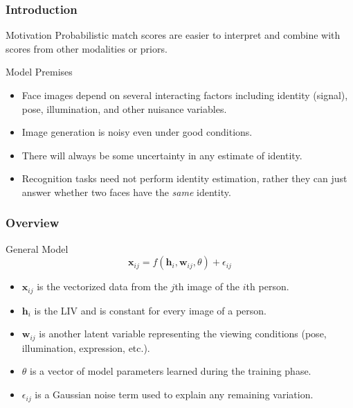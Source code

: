 \documentclass{beamer}
\begin{document}
\begin{frame}
\frametitle{Introduction}
\begin{block}{Motivation}
Probabilistic match scores are easier to interpret and combine with scores from other modalities or priors.
\end{block}
\pause
\begin{block}{Model Premises}
\begin{itemize}
\item Face images depend on several interacting factors including identity (signal), pose, illumination, and other nuisance variables.
\pause
\item Image generation is noisy even under good conditions.
\pause
\item There will always be some uncertainty in any estimate of identity.
\pause
\item Recognition tasks need not perform identity estimation, rather they can just answer whether two faces have the \emph{same} identity.
\end{itemize}
\end{block}
\end{frame}

\begin{frame}
\frametitle{Overview}
\begin{block}{General Model}
\begin{equation}
\mathbf{x}_{ij} = f(\mathbf{h}_i, \mathbf{w}_{ij}, \theta) + \epsilon_{ij}
\end{equation}
\pause
\begin{itemize}
\item $\mathbf{x}_{ij}$ is the vectorized data from the $j$th image of the $i$th person.
\pause
\item $\mathbf{h}_i$ is the LIV and is constant for every image of a person.
\pause
\item $\mathbf{w}_{ij}$ is another latent variable representing the viewing conditions (pose, illumination, expression, etc.).
\pause
\item $\theta$ is a vector of model parameters learned during the training phase.
\pause
\item $\epsilon_{ij}$ is a Gaussian noise term used to explain any remaining variation.
\end{itemize}
\end{block}
\end{frame}
\end{document}
